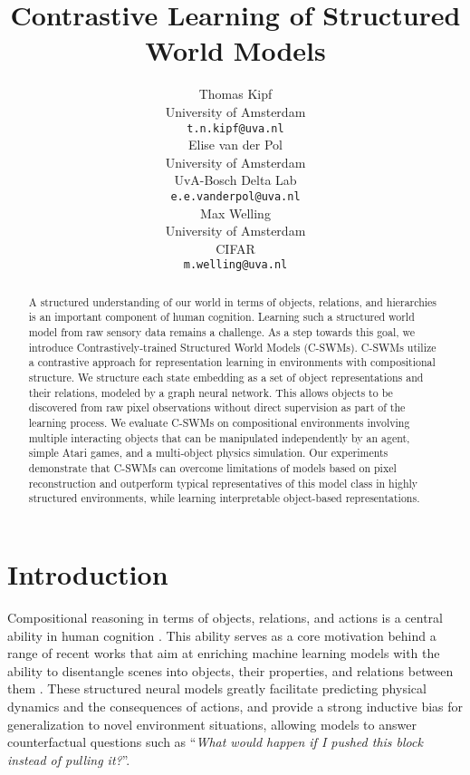 \documentclass{article} %
\title{Contrastive Learning of Structured \\ World Models}
\author{Thomas Kipf \\
University of Amsterdam \\
\texttt{t.n.kipf@uva.nl} \\
\And
Elise van der Pol \\
University of Amsterdam \\
UvA-Bosch Delta Lab \\
\texttt{e.e.vanderpol@uva.nl} \\
\And
Max Welling \\
University of Amsterdam \\
CIFAR\\
\texttt{m.welling@uva.nl} \\
}
\begin{document}
\maketitle

\begin{abstract}
A structured understanding of our world in terms of objects, relations, and hierarchies is an important component of human cognition. Learning such a structured world model from raw sensory data remains a challenge. As a step towards this goal, we introduce Contrastively-trained Structured World Models (C-SWMs). C-SWMs utilize a contrastive approach for representation learning in environments with compositional structure. We structure each state embedding as a set of object representations and their relations, modeled by a graph neural network. This allows objects to be discovered from raw pixel observations without direct supervision as part of the learning process. We evaluate C-SWMs on compositional environments involving multiple interacting objects that can be manipulated independently by an agent, simple Atari games, and a multi-object physics simulation. Our experiments demonstrate that C-SWMs can overcome limitations of models based on pixel reconstruction and outperform typical representatives of this model class in highly structured environments, while learning interpretable object-based representations.
\end{abstract}


\section{Introduction}
Compositional reasoning in terms of objects, relations, and actions is a central ability in human cognition \citep{spelke2007core}. This ability serves as a core motivation behind a range of recent works that aim at enriching machine learning models with the ability to disentangle scenes into objects, their properties, and relations between them  \citep{chang2016compositional,battaglia2016interaction,watters2017visual,van2018relational,kipf2018neural,sun2018actor,sun2019relational,xu2019unsupervised}. These structured neural models greatly facilitate predicting physical dynamics and the consequences of actions, and provide a strong inductive bias for generalization to novel environment situations, allowing models to answer counterfactual questions such as ``\textit{What would happen if I pushed this block instead of pulling it?}''.
\end{document}
